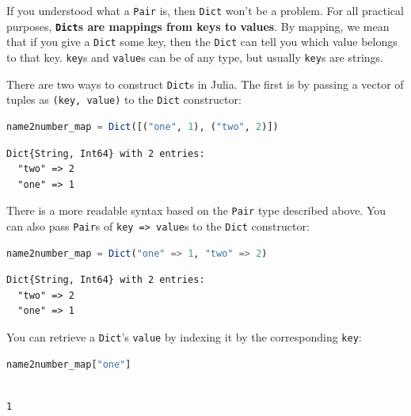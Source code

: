 \documentclass[
  notoc %
]{tufte-book}
\newcommand{\passthrough}[1]{#1}
\begin{document}
If you understood what a \passthrough{\lstinline!Pair!} is, then
\passthrough{\lstinline!Dict!} won't be a problem. For all practical
purposes, \textbf{\passthrough{\lstinline!Dict!}s are mappings from keys
to values}. By mapping, we mean that if you give a
\passthrough{\lstinline!Dict!} some key, then the
\passthrough{\lstinline!Dict!} can tell you which value belongs to that
key. \passthrough{\lstinline!key!}s and \passthrough{\lstinline!value!}s
can be of any type, but usually \passthrough{\lstinline!key!}s are
strings.

There are two ways to construct \passthrough{\lstinline!Dict!}s in
Julia. The first is by passing a vector of tuples as
\passthrough{\lstinline!(key, value)!} to the
\passthrough{\lstinline!Dict!} constructor:

\begin{lstlisting}[language=Julia]
name2number_map = Dict([("one", 1), ("two", 2)])
\end{lstlisting}

\begin{lstlisting}[language=Output]
Dict{String, Int64} with 2 entries:
  "two" => 2
  "one" => 1
\end{lstlisting}

There is a more readable syntax based on the
\passthrough{\lstinline!Pair!} type described above. You can also pass
\passthrough{\lstinline!Pair!}s of
\passthrough{\lstinline!key => value!}s to the
\passthrough{\lstinline!Dict!} constructor:

\begin{lstlisting}[language=Julia]
name2number_map = Dict("one" => 1, "two" => 2)
\end{lstlisting}

\begin{lstlisting}[language=Output]
Dict{String, Int64} with 2 entries:
  "two" => 2
  "one" => 1
\end{lstlisting}

You can retrieve a \passthrough{\lstinline!Dict!}'s
\passthrough{\lstinline!value!} by indexing it by the corresponding
\passthrough{\lstinline!key!}:

\begin{lstlisting}[language=Julia]
name2number_map["one"]
\end{lstlisting}

\begin{lstlisting}[language=Output]

1

\end{lstlisting}
\end{document}
